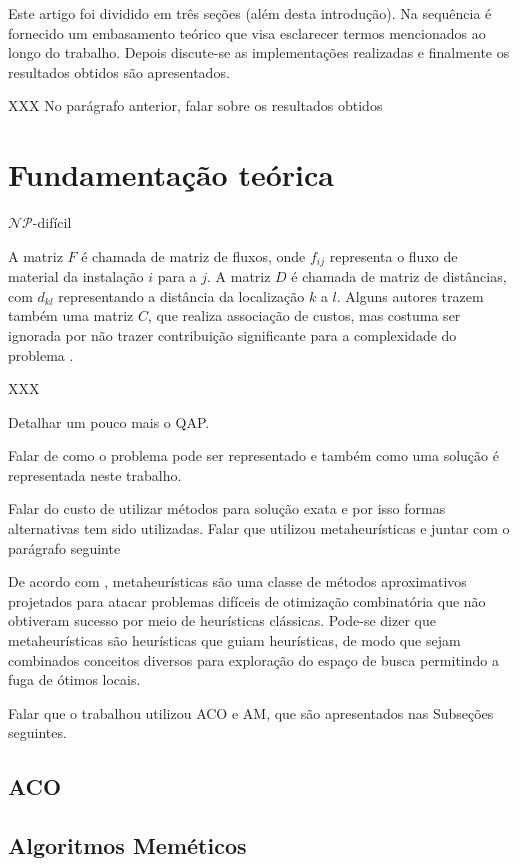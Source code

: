 Este artigo foi dividido em três seções (além desta introdução). Na
sequência é fornecido um embasamento teórico que visa esclarecer
termos mencionados ao longo do trabalho. Depois discute-se as
implementações realizadas e finalmente os resultados obtidos são
apresentados.

XXX No parágrafo anterior, falar sobre os resultados obtidos


\section{Fundamentação teórica}
\label{sec:fund}

$\mathcal{NP}$-difícil

A matriz $F$ é chamada de matriz de fluxos, onde $f_{ij}$ representa o
fluxo de material da instalação $i$ para a $j$. A matriz $D$ é chamada
de matriz de distâncias, com $d_{kl}$ representando a distância da
localização $k$ a $l$. Alguns autores trazem também uma matriz $C$,
que realiza associação de custos, mas costuma ser ignorada por não
trazer contribuição significante para a complexidade do  problema
\cite{QACO}.

XXX

Detalhar um pouco mais o QAP.

Falar de como o problema pode ser representado e também como uma
solução é representada neste trabalho.

Falar do custo de utilizar métodos para solução exata e
por isso formas alternativas tem sido utilizadas.
Falar que utilizou metaheurísticas e juntar com o parágrafo seguinte

De acordo com \cite{metatheory}, metaheurísticas são uma
classe de métodos aproximativos projetados para atacar problemas
difíceis de otimização combinatória que não obtiveram sucesso por meio
de heurísticas clássicas. Pode-se dizer que metaheurísticas são
heurísticas que guiam heurísticas, de modo que sejam combinados
conceitos diversos para exploração do espaço de busca permitindo a
fuga de ótimos locais.

Falar que o trabalhou utilizou ACO e AM, que são apresentados nas
Subseções seguintes.

\subsection{ACO}

\subsection{Algoritmos Meméticos}

